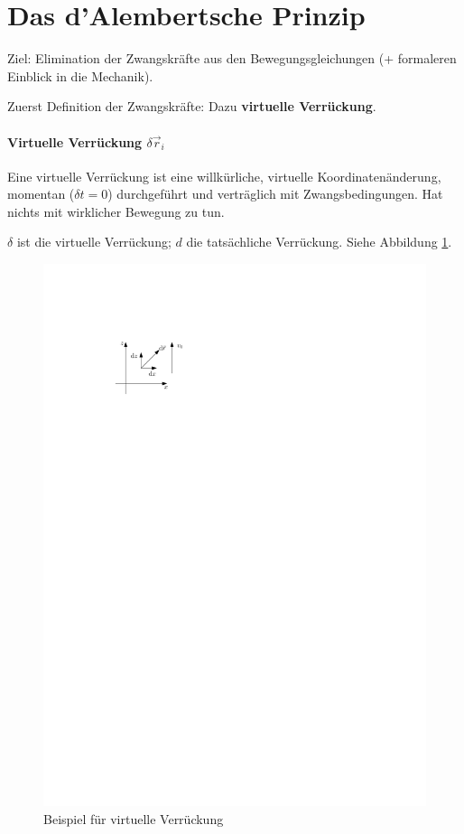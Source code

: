\section{Das d'Alembertsche Prinzip}
Ziel: Elimination der Zwangskräfte aus den Bewegungsgleichungen (+ formaleren Einblick in die Mechanik). 

Zuerst Definition der Zwangskräfte: Dazu \textbf{virtuelle Verrückung}.

\paragraph{Virtuelle Verrückung $\delta \vec r_i$}
Eine virtuelle Verrückung ist eine willkürliche, virtuelle Koordinatenänderung, momentan ($\delta t = 0$) durchgeführt und verträglich mit Zwangsbedingungen. Hat nichts mit wirklicher Bewegung zu tun.

$\delta$ ist die virtuelle Verrückung; $d$ die tatsächliche Verrückung. Siehe Abbildung \ref{fig:ch1_bspverrueckung}.

\begin{figure}
	\centering
	\includegraphics{figures/ch1/bspverrueckung}
	\caption{Beispiel für virtuelle Verrückung}
	\label{fig:ch1_bspverrueckung}
\end{figure}

